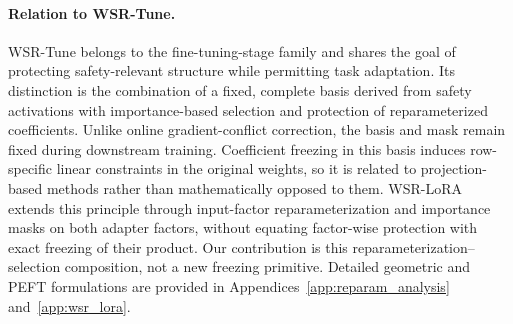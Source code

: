 \documentclass{article}
\begin{document}
\paragraph{Relation to WSR-Tune.} WSR-Tune belongs to the fine-tuning-stage family and shares the goal of protecting safety-relevant structure while permitting task adaptation. Its distinction is the combination of a fixed, complete basis derived from safety activations with importance-based selection and protection of reparameterized coefficients. Unlike online gradient-conflict correction, the basis and mask remain fixed during downstream training. Coefficient freezing in this basis induces row-specific linear constraints in the original weights, so it is related to projection-based methods rather than mathematically opposed to them. WSR-LoRA extends this principle through input-factor reparameterization and importance masks on both adapter factors, without equating factor-wise protection with exact freezing of their product. Our contribution is this reparameterization--selection composition, not a new freezing primitive. Detailed geometric and PEFT formulations are provided in Appendices~\ref{app:reparam_analysis} and~\ref{app:wsr_lora}.









\clearpage
\newpage
\end{document}
